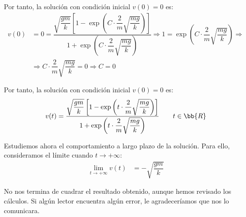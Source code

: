 \begin{ejercicio}
    Por tanto, la solución con condición inicial $v(0)=0$ es:
    \begin{align*}
        v(0)&=0=\dfrac{\sqrt{\dfrac{gm}{k}}\left[1-\exp\left(C\cdot \dfrac{2}{m}\sqrt{\dfrac{mg}{k}}\right)\right]}{1+\exp\left(C\cdot \dfrac{2}{m}\sqrt{\dfrac{mg}{k}}\right)} \Longrightarrow 1 = \exp\left(C\cdot \dfrac{2}{m}\sqrt{\dfrac{mg}{k}}\right)
        \Longrightarrow \\&\Longrightarrow C\cdot \dfrac{2}{m}\sqrt{\dfrac{mg}{k}} = 0 \Longrightarrow C=0
    \end{align*}

    Por tanto, la solución con condición inicial $v(0)=0$ es:
    \begin{equation*}
        v(t)=\dfrac{\sqrt{\dfrac{gm}{k}}\left[1-\exp\left(t\cdot \dfrac{2}{m}\sqrt{\dfrac{mg}{k}}\right)\right]}{1+\exp\left(t\cdot \dfrac{2}{m}\sqrt{\dfrac{mg}{k}}\right)} \qquad t\in \bb{R}
    \end{equation*}

    Estudiemos ahora el comportamiento a largo plazo de la solución. Para ello, consideramos el límite cuando $t\to +\infty$:
    \begin{align*}
        \lim_{t\to +\infty} v(t) &= -\sqrt{\dfrac{gm}{k}}
    \end{align*}

    \begin{observacion}
        No nos termina de cuadrar el resultado obtenido, aunque hemos revisado los cálculos. Si algún lector encuentra algún error, le agradeceríamos que nos lo comunicara.
    \end{observacion}
\end{ejercicio}

